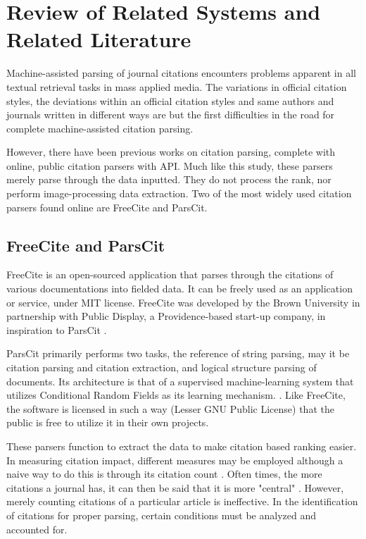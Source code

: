 \chapter{Review of Related Systems and Related Literature}
		Machine-assisted parsing of journal citations encounters problems apparent in all textual retrieval tasks in mass applied media. The variations in official citation styles, the deviations within an official citation styles and same authors and journals written in different ways are but the first difficulties in the road for complete machine-assisted citation parsing.

	However, there have been previous works on citation parsing, complete with online, public citation parsers with API. Much like this study, these parsers merely parse through the data inputted. They do not process the rank, nor perform image-processing data extraction. Two of the most widely used citation parsers found online are FreeCite and ParsCit.

\section{FreeCite and ParsCit}
FreeCite is an open-sourced application that parses through the citations of various documentations into fielded data. It can be freely used as an application or service, under MIT license. FreeCite was developed by the Brown University in partnership with Public Display, a Providence-based start-up company, in inspiration to ParsCit \cite{freecite}.

	ParsCit primarily performs two tasks, the reference of string parsing, may it be citation parsing and citation extraction, and logical structure parsing of documents. Its architecture is that of a supervised machine-learning system that utilizes Conditional Random Fields as its learning mechanism. \cite{parscit}. Like FreeCite, the software is licensed in such a way (Lesser GNU Public License) that the public is free to utilize it in their own projects.

These parsers function to extract the data to make citation based ranking easier. In measuring citation impact, different measures may be employed although a naive way to do this is through its citation count \cite{citation_frequency}. Often times, the more citations a journal has, it can then be said that it is more "central" \cite{eigenfactor_rank}. However, merely counting citations of a particular article is ineffective. In the identification of citations for proper parsing, certain conditions must be analyzed and accounted for.

